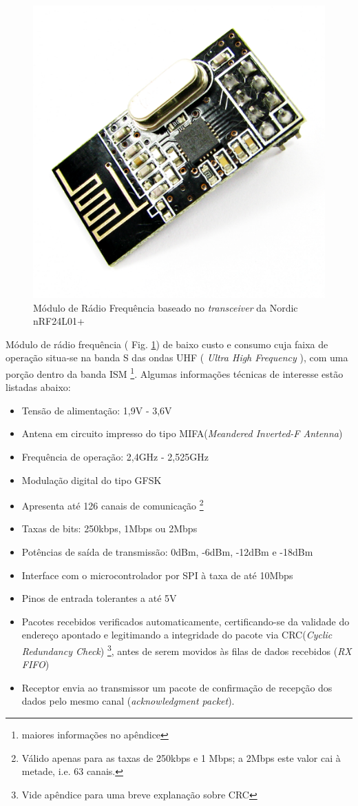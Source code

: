  \begin{figure}[!htb] %
    \centering
    \includegraphics[width=0.5\linewidth]{../../Imagens/nordicc.png}
    \caption{Módulo de Rádio Frequência baseado no \textit{transceiver} da Nordic nRF24L01+}
    \label{Nordic}
  \end{figure}
Módulo de rádio frequência ( Fig. \ref{Nordic}) de baixo custo e consumo cuja faixa de operação situa-se na banda S das ondas UHF ( \textit{Ultra 
High Frequency} ), com uma porção dentro da banda ISM \footnote{maiores informações no apêndice}.
Algumas informações técnicas \cite{nRF} de interesse estão listadas abaixo: 
\begin{itemize}
 \item Tensão de alimentação: 1,9V - 3,6V
 \item Antena em circuito impresso do tipo MIFA(\textit{Meandered Inverted-F Antenna}) \cite{MIFA}
 \item Frequência de operação: 2,4GHz - 2,525GHz
 \item Modulação digital do tipo GFSK 
 \item Apresenta até 126 canais de comunicação \footnote{Válido apenas para as taxas de 250kbps e 1 Mbps; a 2Mbps este valor cai à metade, i.e. 63 
canais.}
 \item Taxas de bits: 250kbps, 1Mbps ou 2Mbps
 \item Potências de saída de transmissão: 0dBm, -6dBm, -12dBm e -18dBm
 \item Interface com o microcontrolador por SPI à taxa de até 10Mbps
 \item Pinos de entrada tolerantes a até 5V
 \item 
Pacotes recebidos verificados automaticamente, certificando-se da validade do endereço apontado e legitimando a integridade 
do pacote via CRC(\textit{Cyclic Redundancy Check}) \footnote{Vide apêndice para uma breve explanação sobre CRC}, antes de 
serem movidos às filas de dados recebidos (\textit{RX FIFO})
 \item Receptor envia ao transmissor um pacote de confirmação de recepção dos dados pelo mesmo canal (\textit{acknowledgment packet}).
\end{itemize}

